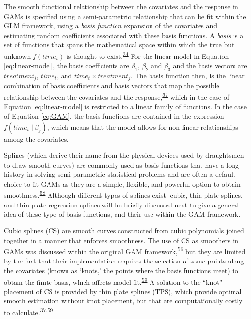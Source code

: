 \documentclass[
]{article}
\begin{document}
The smooth functional relationship between the covariates and the response in GAMs is specified using a semi-parametric relationship that can be fit within the GLM framework, using a \emph{basis function} expansion of the covariates and estimating random coefficients associated with these basis functions. A \emph{basis} is a set of functions that spans the mathematical space within which the true but unknown \(f(time_t)\) is thought to exist.\textsuperscript{\protect\hyperlink{ref-simpson2018}{34}} For the linear model in Equation \eqref{eq:linear-model}, the basis coefficients are \(\beta_1\), \(\beta_2\) and \(\beta_3\) and the basis vectors are \(treatment_j\), \(time_t\), and \(time_t \times treatment_j\). The basis function then, is the linear combination of basis coefficients and basis vectors that map the possible relationship between the covariates and the response,\textsuperscript{\protect\hyperlink{ref-hefley2017}{57}} which in the case of Equation \eqref{eq:linear-model} is restricted to a linear family of functions. In the case of Equation \eqref{eq:GAM}, the basis functions are contained in the expression \(f(time_t\mid \beta_j)\), which means that the model allows for non-linear relationships among the covariates.

Splines (which derive their name from the physical devices used by draughtsmen to draw smooth curves) are commonly used as basis functions that have a long history in solving semi-parametric statistical problems and are often a default choice to fit GAMs as they are a simple, flexible, and powerful option to obtain smoothness.\textsuperscript{\protect\hyperlink{ref-wegman1983}{58}} Although different types of splines exist, cubic, thin plate splines, and thin plate regression splines will be briefly discussed next to give a general idea of these type of basis functions, and their use within the GAM framework.

Cubic splines (CS) are smooth curves constructed from cubic polynomials joined together in a manner that enforces smoothness. The use of CS as smoothers in GAMs was discussed within the original GAM framework,\textsuperscript{\protect\hyperlink{ref-hastie1987}{56}} but they are limited by the fact that their implementation requires the selection of some points along the covariates (known as `knots,' the points where the basis functions meet) to obtain the finite basis, which affects model fit.\textsuperscript{\protect\hyperlink{ref-wood2003}{59}} A solution to the ``knot'' placement of CS is provided by thin plate splines (TPS), which provide optimal smooth estimation without knot placement, but that are computationally costly to calculate.\textsuperscript{\protect\hyperlink{ref-wood2017}{37},\protect\hyperlink{ref-wood2003}{59}}
\end{document}
